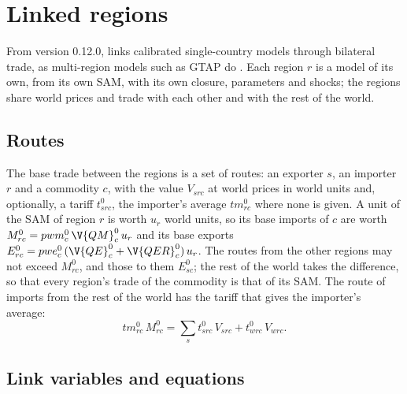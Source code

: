 \chapter{Linked regions}\label{chap:regions}

From version 0.12.0,  links calibrated single-country
models through bilateral trade, as multi-region models such as GTAP do
\citep{hertel1997}. Each region $r$ is a model of its own, from its own SAM,
with its own closure, parameters and shocks; the regions share world prices
and trade with each other and with the rest of the world.

\section{Routes}

The base trade between the regions is a set of routes: an exporter $s$, an
importer $r$ and a commodity $c$, with the value $V_{src}$ at world prices in
world units and, optionally, a tariff $t^0_{src}$, the importer's average
$tm^0_{rc}$ where none is given. A unit of the SAM of region $r$ is worth
$u_r$ world units, so its base imports of $c$ are worth
$M^0_{rc} = pwm^0_c\,\V{QM}^0_c\,u_r$ and its base exports
$E^0_{rc} = pwe^0_c\,(\V{QE}^0_c + \V{QER}^0_c)\,u_r$. The routes from the
other regions may not exceed $M^0_{rc}$, and those to them $E^0_{sc}$; the rest
of the world takes the difference, so that every region's trade of the
commodity is that of its SAM. The route of imports from the rest of the world
has the tariff that gives the importer's average:
\begin{equation*}
tm^0_{rc}\,M^0_{rc} = \sum_s t^0_{src}\,V_{src} + t^0_{wrc}\,V_{wrc}.
\end{equation*}

\section{Link variables and equations}


